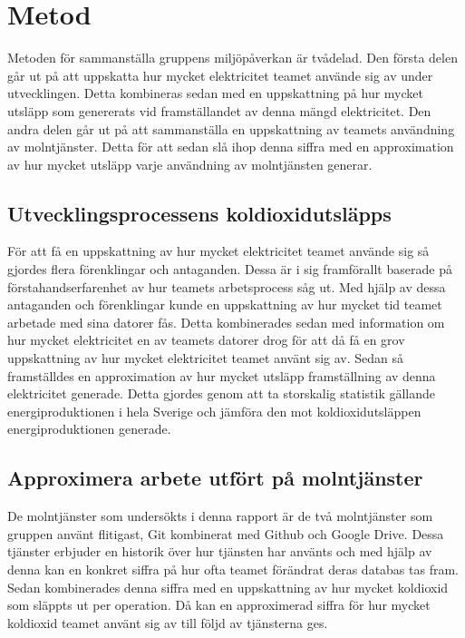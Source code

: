 \section{Metod}
\label{sec:joel_a-method}

Metoden för sammanställa gruppens miljöpåverkan är tvådelad. Den första delen går ut på att uppskatta hur mycket elektricitet teamet använde sig av under utvecklingen. Detta kombineras sedan med en uppskattning på hur mycket utsläpp som genererats vid framställandet av denna mängd elektricitet. Den andra delen går ut på att  sammanställa en uppskattning av teamets användning av molntjänster. Detta för att sedan slå ihop denna siffra med en approximation av hur mycket utsläpp varje användning av molntjänsten generar.

\subsection{Utvecklingsprocessens koldioxidutsläpps}
För att få en uppskattning av hur mycket elektricitet teamet använde sig så gjordes flera förenklingar och antaganden. Dessa är i sig framförallt baserade på förstahandserfarenhet av hur teamets arbetsprocess såg ut. Med hjälp av dessa antaganden och förenklingar kunde en uppskattning av hur mycket tid teamet arbetade med sina datorer fås. Detta kombinerades sedan med information om hur mycket elektricitet en av teamets datorer drog för att då få en grov uppskattning av hur mycket elektricitet teamet använt sig av. Sedan så framställdes en approximation av hur mycket utsläpp framställning av denna elektricitet generade. Detta gjordes genom att ta storskalig statistik gällande energiproduktionen i hela Sverige och jämföra den mot koldioxidutsläppen energiproduktionen generade.

\subsection{Approximera arbete utfört på molntjänster}
\label{joel_a-method-cloud-nr}
De molntjänster som undersökts i denna rapport är de två molntjänster som gruppen använt flitigast, Git kombinerat med Github och Google Drive. Dessa tjänster erbjuder en historik över hur tjänsten har använts och med hjälp av denna kan en konkret siffra på hur ofta teamet förändrat deras databas tas fram. Sedan kombinerades denna siffra med en uppskattning av hur mycket koldioxid som släppts ut per operation. Då kan en approximerad siffra för hur mycket koldioxid teamet använt sig av till följd av tjänsterna ges. 

